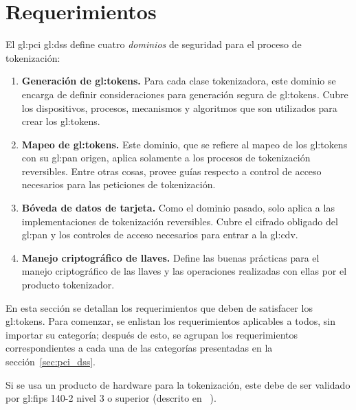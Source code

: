 %
%

\section{Requerimientos}
\label{sec:requerimientos}

El \gls{gl:pci} \gls{gl:dss} define cuatro \textit{dominios} de seguridad para
el proceso de tokenización:

\begin{enumerate}

  \item \label{dm:gen_tokens} \textbf{Generación de \glspl{gl:token}.}
    Para cada clase tokenizadora, este dominio se encarga de definir
    consideraciones para generación segura de \glspl{gl:token}. Cubre los
    dispositivos, procesos, mecanismos y algoritmos que son utilizados para
    crear los \glspl{gl:token}.

  \item \label{dm:mapeo_tokens} \textbf{Mapeo de \glspl{gl:token}.}
    Este dominio, que se refiere al mapeo de los \glspl{gl:token} con su
    \gls{gl:pan} origen, aplica solamente a los procesos de tokenización
    reversibles. Entre otras cosas, provee guías respecto a control de acceso
    necesarios para las peticiones de tokenización.

  \item \label{dm:card_data} \textbf{Bóveda de datos de tarjeta.}
    Como el dominio pasado, solo aplica a las implementaciones de tokenización
    reversibles. Cubre el cifrado obligado del \gls{gl:pan} y los controles de
    acceso necesarios para entrar a la \gls{gl:cdv}.

  \item \label{dm:man_llaves} \textbf{Manejo criptográfico de llaves.}
    Define las buenas prácticas para el manejo criptográfico de las llaves y
    las operaciones realizadas con ellas por el producto tokenizador.

\end{enumerate}

En esta sección se detallan los requerimientos que deben de satisfacer los
\glspl{gl:token}. Para comenzar, se enlistan los requerimientos
aplicables a todos, sin importar su categoría; después de esto, se agrupan los
requerimientos correspondientes a cada una de las categorías presentadas en
la sección~\ref{sec:pci_dss}.

{
  Si se usa un producto de hardware para la tokenización, este debe de ser
  validado por \gls{gl:fips} 140-2 nivel 3 o superior (descrito en
 ~\cite{nist_modulos_criptograficos}).
}

